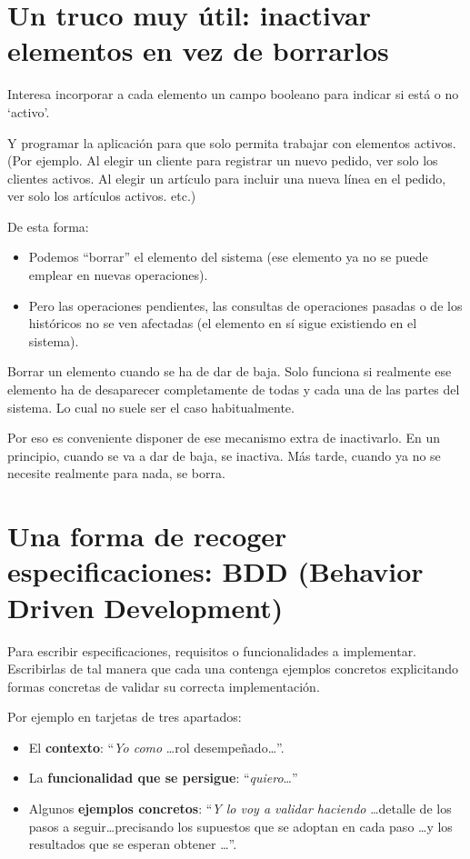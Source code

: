 \documentclass[spanish,12pt,a4paper,final,oneside]{book}
\begin{document}
\section{Un truco muy útil: inactivar elementos en vez de borrarlos}
Interesa incorporar a cada elemento un campo booleano para indicar si está o no `activo'. 

Y programar la aplicación para que solo permita trabajar con elementos activos. (Por ejemplo. Al elegir un cliente para registrar un nuevo pedido, ver solo los clientes activos. Al elegir un artículo para incluir una nueva línea en el pedido, ver solo los artículos activos. etc.)

De esta forma:
\begin{itemize}
\item Podemos ``borrar'' el elemento del sistema (ese elemento ya no se puede emplear en nuevas operaciones).
\item Pero las operaciones pendientes, las consultas de operaciones pasadas o de los históricos no se ven afectadas (el elemento en sí sigue existiendo en el sistema).
\end{itemize}

Borrar un elemento cuando se ha de dar de baja. Solo funciona si realmente ese elemento ha de desaparecer completamente de todas y cada una de las partes del sistema. Lo cual no suele ser el caso habitualmente.

Por eso es conveniente disponer de ese mecanismo extra de inactivarlo. En un principio, cuando se va a dar de baja, se inactiva. Más tarde, cuando ya no se necesite realmente para nada, se  borra.



\section{Una forma de recoger especificaciones: BDD (Behavior Driven Development)}

Para escribir especificaciones, requisitos o funcionalidades a implementar. Escribirlas de tal manera que cada una contenga ejemplos concretos explicitando formas concretas de validar su correcta implementación.

Por ejemplo en tarjetas de tres apartados:
\begin{itemize}

\item El \textbf{contexto}: ``\textit{Yo como} \ldots rol desempeñado\ldots''. 

\item La \textbf{funcionalidad que se persigue}: ``\textit{quiero}\ldots''

\item Algunos \textbf{ejemplos concretos}: ``\textit{Y lo voy a validar haciendo} \ldots detalle de los pasos a seguir\ldots precisando los supuestos que se adoptan en cada paso \ldots y los resultados que se esperan obtener \ldots''.

\end{itemize}
\end{document}
